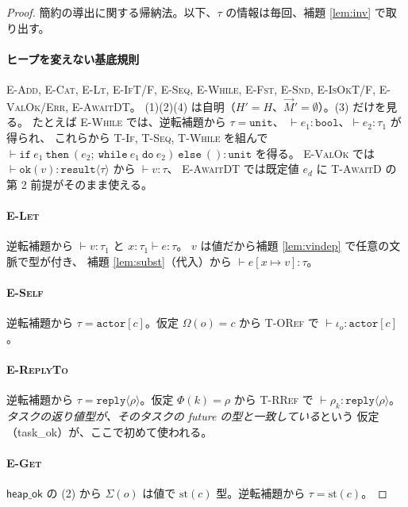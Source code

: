 \documentclass[11pt,a4paper]{ltjsarticle}
\theoremstyle{definition}
\theoremstyle{remark}
\newcommand{\tbool}{\ensuremath{\mathtt{bool}}}
\newcommand{\tunit}{\ensuremath{\mathtt{unit}}}
\newcommand{\tact}[1]{\ensuremath{\mathtt{actor}[#1]}}
\newcommand{\trep}[1]{\ensuremath{\mathtt{reply}\langle #1 \rangle}}
\newcommand{\tres}[1]{\ensuremath{\mathtt{result}\langle #1 \rangle}}
\newcommand{\Om}{\Omega}
\newcommand{\Sm}{\Sigma}
\newcommand{\Ph}{\Phi}
\newcommand{\styp}{\mathrm{st}}
\newcommand{\heapok}{\textsf{heap\_ok}}
\newcommand{\taskok}{\textsf{task\_ok}}
\newcommand{\subs}[2]{[#1 \mapsto #2]}
\begin{document}
\begin{proof}
簡約の導出に関する帰納法。以下、$\tau$ の情報は毎回、補題 \ref{lem:inv} で取り出す。

\paragraph{ヒープを変えない基底規則}
\textsc{E-Add}, \textsc{E-Cat}, \textsc{E-Lt}, \textsc{E-IfT/F}, \textsc{E-Seq},
\textsc{E-While}, \textsc{E-Fst}, \textsc{E-Snd}, \textsc{E-IsOkT/F},
\textsc{E-ValOk/Err}, \textsc{E-AwaitDT}。
(1)(2)(4) は自明（$H'=H$、$\vec{M}'=\emptyset$）。(3) だけを見る。
たとえば \textsc{E-While} では、逆転補題から $\tau = \tunit$、
$\vdash e_1 : \tbool$、$\vdash e_2 : \tau_1$ が得られ、
これらから \textsc{T-If}, \textsc{T-Seq}, \textsc{T-While} を組んで
$\vdash \mathtt{if}\ e_1\ \mathtt{then}\ (e_2;\ \mathtt{while}\ e_1\ \mathtt{do}\ e_2)\ \mathtt{else}\ () : \tunit$ を得る。
\textsc{E-ValOk} では $\vdash \mathtt{ok}(v) : \tres{\tau}$ から $\vdash v : \tau$、
\textsc{E-AwaitDT} では既定値 $e_d$ に \textsc{T-AwaitD} の第 2 前提がそのまま使える。

\paragraph{\textsc{E-Let}}
逆転補題から $\vdash v : \tau_1$ と $x{:}\tau_1 \vdash e : \tau$。
$v$ は値だから補題 \ref{lem:vindep} で任意の文脈で型が付き、
補題 \ref{lem:subst}（代入）から $\vdash e\subs{x}{v} : \tau$。

\paragraph{\textsc{E-Self}}
逆転補題から $\tau = \tact{c}$。仮定 $\Om(o) = c$ から \textsc{T-ORef} で
$\vdash \iota_o : \tact{c}$。

\paragraph{\textsc{E-ReplyTo}}
逆転補題から $\tau = \trep{\rho}$。仮定 $\Ph(k) = \rho$ から \textsc{T-RRef} で
$\vdash \rho_k : \trep{\rho}$。
\emph{タスクの返り値型が、そのタスクの future の型と一致している}という
仮定（\taskok）が、ここで初めて使われる。

\paragraph{\textsc{E-Get}}
$\heapok$ の (2) から $\Sm(o)$ は値で $\styp(c)$ 型。逆転補題から $\tau = \styp(c)$。


\end{proof}
\end{document}

